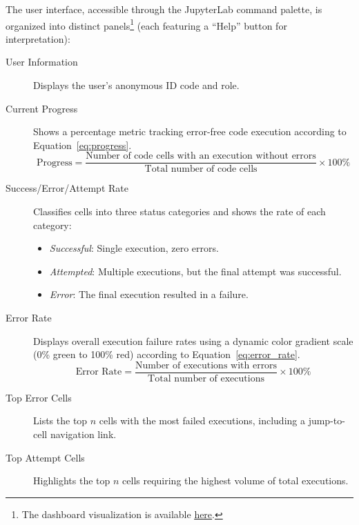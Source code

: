 \documentclass[acmsmall]{acmart}
\begin{document}
The user interface, accessible through the JupyterLab command palette, is organized into distinct panels\footnote{The dashboard visualization is available \href{https://git.uni-due.de/colaps/la-rp/group-4/la-extension/-/raw/master/MUC\%20-\%20StudentResearchCompetition/Dashboard/Dashboard.pdf?ref_type=heads&inline=true}{\color{blue}\underline{here}}.} (each featuring a ``Help'' button for interpretation):
\begin{description}
    \item[User Information] Displays the user's anonymous ID code and role.

    \item[Current Progress] Shows a percentage metric tracking error-free code execution according to Equation~\eqref{eq:progress}.
    \begin{equation}\label{eq:progress}
        \text{Progress} = \frac{\text{Number of code cells with an execution without errors}}{\text{Total number of code cells}}
        \times 100\%
    \end{equation}

    \item[Success/Error/Attempt Rate] Classifies cells into three status categories and shows the rate of each category:
    \begin{itemize}
        \item \emph{Successful}: Single execution, zero errors.
        \item \emph{Attempted}: Multiple executions, but the final attempt was successful.
        \item \emph{Error}: The final execution resulted in a failure.
    \end{itemize}

    \item[Error Rate] Displays overall execution failure rates using a dynamic color gradient scale (0\% green to 100\% red) according to Equation~\eqref{eq:error_rate}.
    \begin{equation}\label{eq:error_rate}
        \text{Error Rate} = \frac{\text{Number of executions with errors}}{\text{Total number of executions}}
        \times 100\%
    \end{equation}

    \item[Top Error Cells] Lists the top $n$ cells with the most failed executions, including a jump-to-cell navigation link.

    \item[Top Attempt Cells] Highlights the top $n$ cells requiring the highest volume of total executions.


\end{description}
\end{document}
